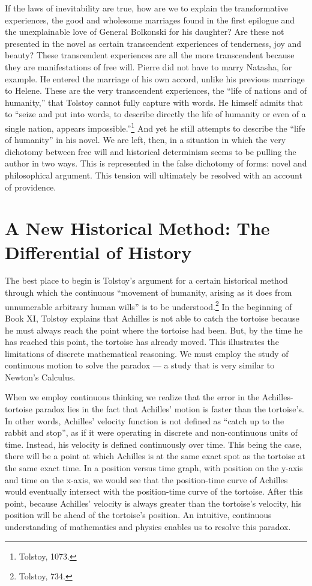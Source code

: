 \documentclass[12pt]{article}
\begin{document}
If the laws of inevitability are true, how are we to explain the transformative experiences, the good and wholesome marriages found in the first epilogue and the unexplainable love of General Bolkonski for his daughter? Are these not presented in the novel as certain transcendent experiences of tenderness, joy and beauty? These transcendent experiences are all the more transcendent because they are manifestations of free will. Pierre did not have to marry Natasha, for example. He entered the marriage of his own accord, unlike his previous marriage to Helene. These are the very transcendent experiences, the ``life of nations and of humanity,'' that Tolstoy cannot fully capture with words. He himself admits that to ``seize and put into words, to describe directly the life of humanity or even of a single nation, appears impossible.''\footnote{Tolstoy, 1073.} And yet he still attempts to describe the ``life of humanity'' in his novel. We are left, then, in a situation in which the very dichotomy between free will and historical determinism seems to be pulling the author in two ways. This is represented in the false dichotomy of forms: novel and philosophical argument. This tension will ultimately be resolved with an account of providence.

\section{A New Historical Method: The Differential of History}
The best place to begin is Tolstoy's argument for a certain historical method through which the continuous ``movement of humanity, arising as it does from unnumerable arbitrary human wills'' is to be understood.\footnote{Tolstoy, 734.} In the beginning of Book XI, Tolstoy explains that Achilles is not able to catch the tortoise because he must always reach the point where the tortoise had been. But, by the time he has reached this point, the tortoise has already moved. This illustrates the limitations of discrete mathematical reasoning. We must employ the study of continuous motion to solve the paradox --- a study that is very similar to Newton's Calculus.

When we employ continuous thinking we realize that the error in the Achilles-tortoise paradox lies in the fact that Achilles' motion is faster than the tortoise's. In other words, Achilles' velocity function is not defined as ``catch up to the rabbit and stop'', as if it were operating in discrete and non-continuous units of time. Instead, his velocity is defined continuously over time. This being the case, there will be a point at which Achilles is at the same exact spot as the tortoise at the same exact time. In a position versus time graph, with position on the y-axis and time on the x-axis, we would see that the position-time curve of Achilles would eventually intersect with the position-time curve of the tortoise. After this point, because Achilles' velocity is always greater than the tortoise's velocity, his position will be ahead of the tortoise's position. An intuitive, continuous understanding of mathematics and physics enables us to resolve this paradox.
\end{document}

